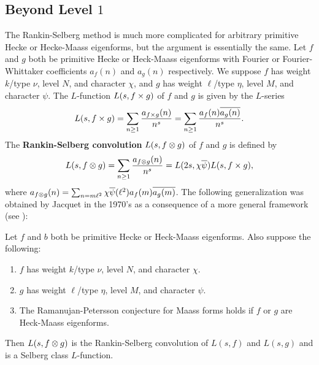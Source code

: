     \subsection*{Beyond Level \texorpdfstring{$1$}{1}}
      The Rankin-Selberg method is much more complicated for arbitrary primitive Hecke or Hecke-Maass eigenforms, but the argument is essentially the same. Let $f$ and $g$ both be primitive Hecke or Heck-Maass eigenforms with Fourier or Fourier-Whittaker coefficients $a_{f}(n)$ and $a_{g}(n)$ respectively. We suppose $f$ has weight $k$/type $\nu$, level $N$, and character $\chi$, and $g$ has weight $\ell$/type $\eta$, level $M$, and character $\psi$. 
      The $L$-function $L(s,f \times g)$ of $f$ and $g$ is given by the $L$-series
      \[
        L(s,f \times g) = \sum_{n \ge 1}\frac{a_{f \times g}(n)}{n^{s}} = \sum_{n \ge 1}\frac{a_{f}(n)\overline{a_{g}(n)}}{n^{s}}.
      \]
      The \textbf{Rankin-Selberg convolution} $L(s,f \otimes g)$ of $f$ and $g$ is defined by
      \[
        L(s,f \otimes g) = \sum_{n \ge 1}\frac{a_{f \otimes g}(n)}{n^{s}} = L(2s,\chi\overline{\psi})L(s,f \times g),
      \]
      where $a_{f \otimes g}(n) = \sum_{n = m\ell^{2}}\chi\overline{\psi}(\ell^{2})a_{f}(m)\overline{a_{g}(m)}$. The following generalization was obtained by Jacquet in the 1970's as a consequence of a more general framework (see \cite{jacquet1970automorphic,jacquet1972automorphic}):

      \begin{theorem}\label{thm:generalization_Rankin_Selberg_method}
        Let $f$ and $b$ both be primitive Hecke or Heck-Maass eigenforms. Also suppose the following: 
        \begin{enumerate}[label=(\roman*)]
          \item $f$ has weight $k$/type $\nu$, level $N$, and character $\chi$.
          \item $g$ has weight $\ell$/type $\eta$, level $M$, and character $\psi$.
          \item The Ramanujan-Petersson conjecture for Maass forms holds if $f$ or $g$ are Heck-Maass eigenforms.
        \end{enumerate}
        Then $L(s,f \otimes g)$ is the Rankin-Selberg convolution of $L(s,f)$ and $L(s,g)$ and is a Selberg class $L$-function.
      \end{theorem}

